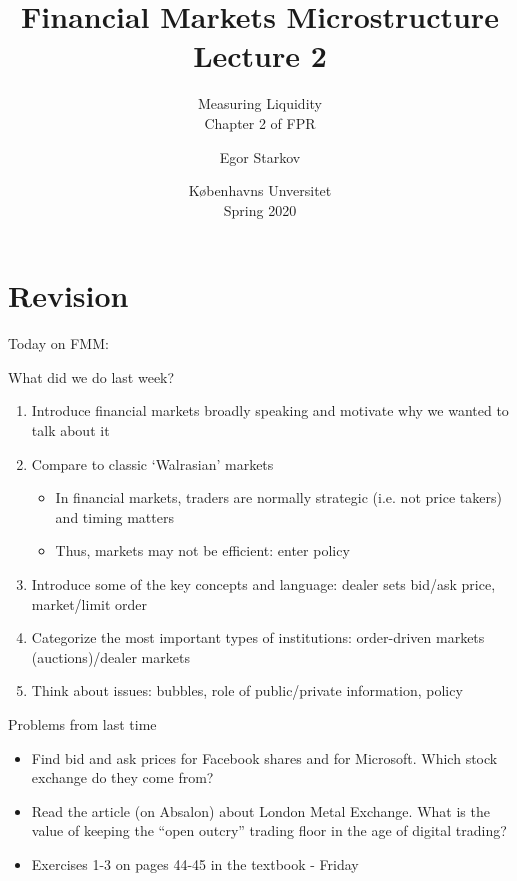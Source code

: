 \documentclass[english,10pt]{beamer}
\title{Financial Markets Microstructure \\ Lecture 2}
\subtitle{Measuring Liquidity \\
Chapter 2 of FPR}
\author{Egor Starkov}
\date{K{\o}benhavns Unversitet \\
	Spring 2020}
\begin{document}
\frame[plain]{\titlepage}
\addtocounter{framenumber}{-1}


\section{Revision}

\begin{frame}{Today on FMM:}
	\tableofcontents[currentsection]
\end{frame}


\begin{frame}{What did we do last week?}
	\begin{enumerate}
		\item Introduce financial markets broadly speaking and motivate why we wanted to talk about it
		\item Compare to classic `Walrasian' markets
		\begin{itemize}
			\item In financial markets, traders are normally strategic (i.e. not price takers) and timing matters
			\item Thus, markets may not be efficient: enter policy
		\end{itemize}
		\item Introduce some of the key concepts and language: dealer sets bid/ask price, market/limit order
		\item Categorize the most important types of institutions:  order-driven markets (auctions)/dealer markets
		\item Think about issues: bubbles, role of public/private information, policy
	\end{enumerate}
\end{frame}


\begin{frame}{Problems from last time}
	\begin{itemize}
		\item Find bid and ask prices for Facebook shares and for Microsoft. Which stock exchange do they come from? 
		\item Read the article (on Absalon) about London Metal Exchange. What is the value of keeping the ``open outcry'' trading floor in the age of digital trading?
		\item Exercises 1-3 on pages 44-45 in the textbook - Friday
	\end{itemize}
\end{frame}
\end{document}

